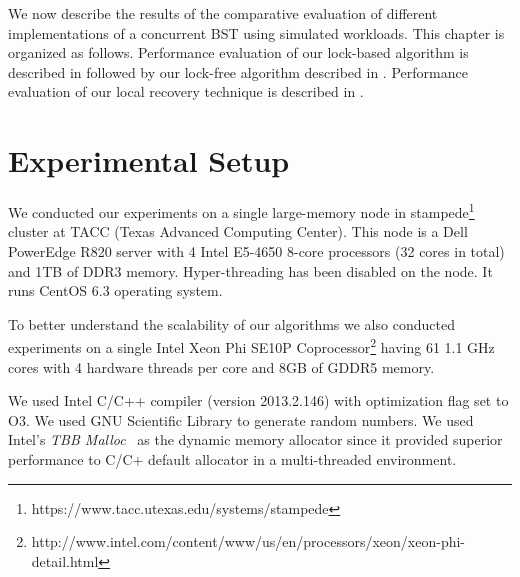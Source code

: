 We now describe the results of the comparative evaluation of different implementations of a concurrent BST using simulated workloads. This chapter is organized as follows. Performance evaluation of our lock-based algorithm is described in  followed by our lock-free algorithm described in . Performance evaluation of our local recovery technique is described in .

\section{Experimental Setup} 
We conducted our experiments on a single large-memory node in stampede\footnote{https://www.tacc.utexas.edu/systems/stampede} cluster at TACC (Texas Advanced Computing Center). This node is a Dell PowerEdge R820 server with 4 Intel E5-4650 8-core processors (32 cores in total) and 1TB of DDR3 memory. Hyper-threading has been disabled on the node. It runs CentOS 6.3 operating system.  

To better understand the scalability of our algorithms we also conducted experiments on a single Intel Xeon Phi SE10P Coprocessor\footnote{http://www.intel.com/content/www/us/en/processors/xeon/xeon-phi-detail.html} having 61 1.1 GHz cores with 4 hardware threads per core and 8GB of GDDR5 memory.

We used Intel C/C++ compiler (version 2013.2.146) with optimization flag set to O3. We used GNU Scientific Library to generate random numbers. We used Intel's \emph{TBB Malloc}~\cite{Rei:2007:Book} as the dynamic memory allocator since it provided superior performance to C/C+ default allocator in a multi-threaded environment.

